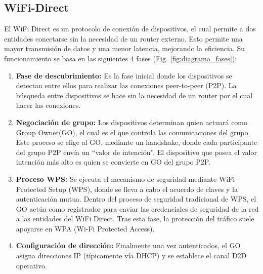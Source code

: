 \documentclass[conference,a4paper,onecolumn,11pt]{IEEEtran} %
\begin{document}
\subsection{WiFi-Direct}
El WiFi Direct es un protocolo de conexión de dispositivos, el cual permite a dos entidades conectarse sin la necesidad de un router externo. Esto permite una mayor transmisión de datos y una menor latencia, mejorando la eficiencia. Su funcionamiento se basa en las siguientes 4 fases (Fig. \ref{fig:diagrama_fases}):\cite{shen2016secure}
\begin{enumerate}
    \item \textbf{Fase de descubrimiento:} Es la fase inicial donde los dispositivos se detectan entre ellos para realizar las conexiones peer-to-peer (P2P). La búsqueda entre dispositivos se hace sin la necesidad de un router por el cual hacer las conexiones. 
    \item \textbf{Negociación de grupo:} Los dispositivos determinan quien actuará como Group Owner(GO), el cual es el que controla las comunicaciones del grupo. Este proceso se elige al GO, mediante un  handshake, donde cada participante del grupo P2P envía un “valor de intención”. El dispositivo que posea el valor intención más alto es quien se convierte en GO del grupo P2P.
    \item \textbf{Proceso WPS:} Se ejecuta el mecanismo de seguridad mediante WiFi Protected Setup (WPS), donde se lleva a cabo el acuerdo de claves y la autenticación mutua. Dentro del proceso de seguridad tradicional de WPS, el GO actúa como registrador para enviar las credenciales de seguridad de la red a las entidades del WiFi Direct. Tras esta fase, la protección del tráfico suele apoyarse en WPA (Wi-Fi Protected Access).
    \item \textbf{Configuración de dirección:} Finalmente una vez autenticados, el GO asigna direcciones IP (típicamente vía DHCP) y se establece el canal D2D operativo.
\end{enumerate}
\end{document}
